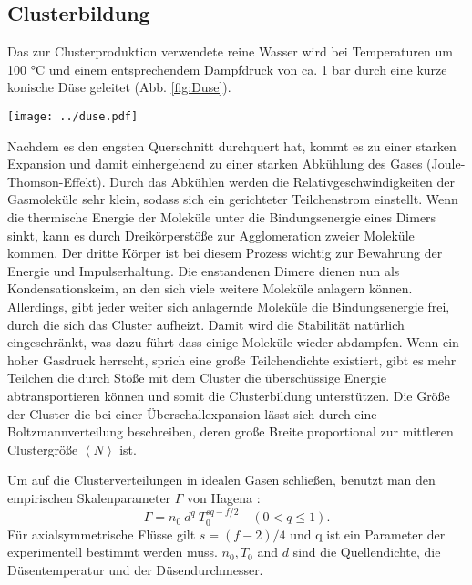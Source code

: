 \subsection{Clusterbildung}

Das zur Clusterproduktion verwendete reine Wasser wird bei Temperaturen um 100 °C und einem entsprechendem Dampfdruck von ca. 1 bar durch eine kurze konische Düse geleitet (Abb. \ref{fig:Duse}).
%
\begin{center}
\begin{minipage}{\linewidth}
\centering
\texttt{[image: ../duse.pdf]}%
 \label{fig:Duse}
\end{minipage} 
\end{center} 

Nachdem es den engsten Querschnitt durchquert hat, kommt es zu einer starken Expansion und damit einhergehend zu einer starken Abkühlung des Gases (Joule-Thomson-Effekt). Durch das Abkühlen werden die Relativgeschwindigkeiten der Gasmoleküle sehr klein, sodass sich ein gerichteter Teilchenstrom einstellt. Wenn die thermische Energie der Moleküle unter die Bindungsenergie eines Dimers sinkt, kann es durch Dreikörperstöße zur Agglomeration zweier Moleküle kommen. Der dritte Körper ist bei diesem Prozess wichtig zur Bewahrung der Energie und Impulserhaltung. Die enstandenen Dimere dienen nun als Kondensationskeim, an den sich viele weitere Moleküle anlagern können. Allerdings, gibt jeder weiter sich anlagernde Moleküle die Bindungsenergie frei, durch die sich das Cluster aufheizt. Damit wird die Stabilität natürlich eingeschränkt, was dazu führt dass einige Moleküle wieder abdampfen. Wenn ein hoher Gasdruck herrscht, sprich eine große Teilchendichte existiert, gibt es mehr Teilchen die durch Stöße mit dem Cluster die überschüssige Energie abtransportieren können und somit die Clusterbildung unterstützen.
Die Größe der Cluster die bei einer Überschallexpansion lässt sich durch eine Boltzmannverteilung beschreiben, deren große Breite proportional zur mittleren Clustergröße $\left\langle N \right\rangle$ ist. 

Um auf die Clusterverteilungen in idealen Gasen schließen, benutzt man den empirischen Skalenparameter $\Gamma$ von Hagena \cite{hagena1987}:
%
\begin{equation} \label{eq:Skalenparameter}
\Gamma = n_0\ d^q\ T_0^{sq - f/2} \quad (0 < q \leq 1).
\end{equation}
%
Für axialsymmetrische Flüsse gilt $s = (f-2)/4$ und q ist ein Parameter der experimentell bestimmt werden muss. $n_0, T_0$ and $d$ sind die Quellendichte, die Düsentemperatur und der Düsendurchmesser.

